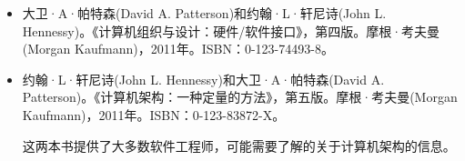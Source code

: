 \begin{itemize}
\item
大卫·A·帕特森(David A. Patterson)和约翰·L·轩尼诗(John L. Hennessy)。《计算机组织与设计：硬件/软件接口》，第四版。摩根·考夫曼(Morgan Kaufmann)，2011年。ISBN：0-123-74493-8。

\item
约翰·L·轩尼诗(John L. Hennessy)和大卫·A·帕特森(David A. Patterson)。《计算机架构：一种定量的方法》，第五版。摩根·考夫曼(Morgan Kaufmann)，2011年。ISBN：0-123-83872-X。

\hspace*{\fill}

这两本书提供了大多数软件工程师，可能需要了解的关于计算机架构的信息。
\end{itemize}

